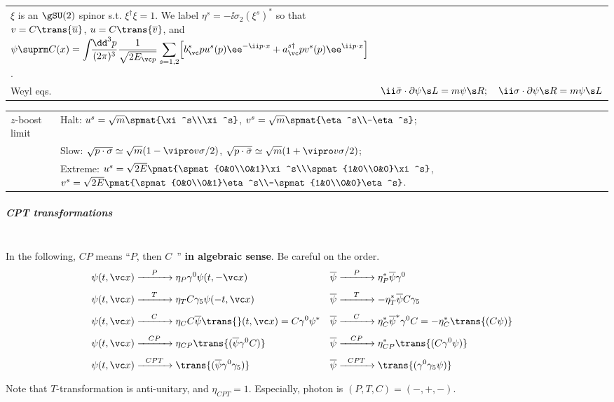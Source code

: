 \begin{tabular}{l@{ :\ \ }l}
\parbox[t]{26.4em}{
$\xi$ is an $\gSU(2)$ spinor s.t. $\xi^\dagger\xi=1$.\\
We label $\eta^s=-\ii\sigma_2(\xi^s)^*$ so that $v=C\trans{\overline u}$, $u=C\trans{\overline v}$, and
\\\hfill
$\displaystyle\psi\suprm C(x)=\intdP{p} \frac{1}{\sqrt{2E_{\vc p}}}
               \sum_{s=1,2}\Bigl[b^s_\vc p u^s(p)\ee^{-\ii p\cdot x}
                + a^{s\dagger}_\vc p v^s(p)\ee^{\ii p\cdot x}\Bigr]$.
}
\\
Weyl eqs. & $\ii\bar\sigma\cdot\partial\psi\s L=m\psi\s R;\quad
             \ii\sigma\cdot\partial\psi\s R=m\psi\s L$\\
\end{tabular}


\begin{tabular}{l@{ :\ \ \ }l}
$z$-boost limit &
Halt: $u^s=\sqrt{m}\spmat{\xi^s\\\xi^s}$, $v^s=\sqrt{m}\spmat{\eta^s\\-\eta^s}$;\\
&Slow:
$\sqrt{p\cdot\sigma}\simeq \sqrt m(1-\vipro v\sigma/2)$,
$\sqrt{p\cdot\bar\sigma}\simeq \sqrt m(1+\vipro v\sigma/2)$;\\
&Extreme:
 $u^s=\sqrt{2E}\pmat{\spmat{0&0\\0&1}\xi^s\\\spmat{1&0\\0&0}\xi^s}$,
 $v^s=\sqrt{2E}\pmat{\spmat{0&0\\0&1}\eta^s\\-\spmat{1&0\\0&0}\eta^s}$.
\end{tabular}

\subparagraph{CPT transformations}\mbox{}\\
In the following, $CP$ means ``$P$, then $C$\ '' {\bf in algebraic sense}. Be careful on the order.
\begin{align*}
 \psi(t,\vc x) &\xrightarrow[\hskip30pt]{P} \eta_P  \G0\psi(t,-\vc x)&
 \overline\psi       &\xrightarrow[\hskip30pt]{P} \eta_P^* \overline\psi\G0\\
 \psi(t,\vc x) &\xrightarrow[\hskip30pt]{T} \eta_T C\G5\psi(-t,\vc x)&
 \overline\psi       &\xrightarrow[\hskip30pt]{T} -\eta_T^* \overline\psi C\G5\\
 \psi(t,\vc x) &\xrightarrow[\hskip30pt]{C} \eta_C   C\overline\psi\trans{}(t,\vc x)=C\G0\psi^*&
 \overline\psi       &\xrightarrow[\hskip30pt]{C} \eta_C^* \overline\psi^*\G0C = -\eta_C^*\trans{(C\psi)}\\
 \psi(t,\vc x) &\xrightarrow[\hskip30pt]{CP} \eta_{CP}\trans{(\overline\psi \G0C)}&
 \overline\psi       &\xrightarrow[\hskip30pt]{CP} \eta_{CP}^*\trans{(C\G0\psi)}\\
 \psi(t,\vc x) &\xrightarrow[\hskip30pt]{CPT} \trans{(\overline\psi\G0\G5)}&
 \overline\psi       &\xrightarrow[\hskip30pt]{CPT} \trans{(\G0\G5\psi)}&
\end{align*}
Note that $T$-transformation is anti-unitary, and $\eta_{CPT}=1$.
Especially, photon is $(P,T,C)=(-,+,-)$.

